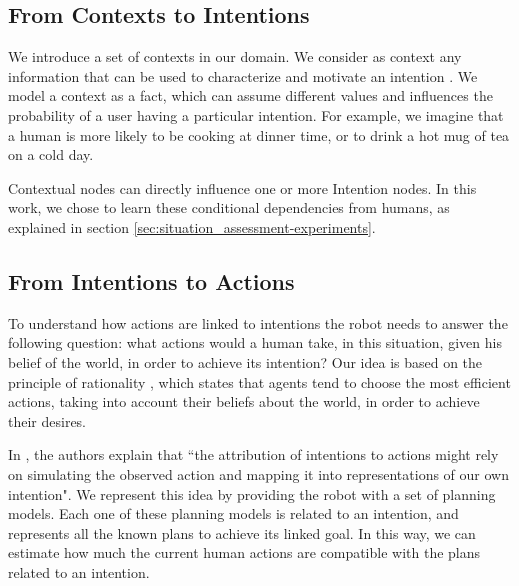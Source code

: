 \subsection{From Contexts to Intentions}
We introduce a set of contexts in our domain. We consider as context any information that can be used to characterize and motivate an intention \cite{abowd1999towards}. We model a context  as a fact, which can assume different values and influences the probability of a user having a particular intention. For example, we imagine that a human is more likely to be cooking at dinner time, or to drink a hot mug of tea on a cold day.

Contextual nodes can directly influence one or more Intention nodes. In this work, we chose to learn these conditional dependencies from humans, as explained in section \ref{sec:situation_assessment-experiments}.

\subsection{From Intentions to Actions}
\label{sec:situation_assessment-action_evaluation}
To understand how actions are linked to intentions the robot needs to answer the following question: what actions would a human take, in this situation, given his belief of the world, in order to achieve its intention?
Our idea is based on the principle of rationality \cite{Dennet1989}, which states that agents tend to choose the most efficient actions, taking into account their beliefs about the world, in order to achieve their desires.

In \cite{Blakemore2001}, the authors explain that ``the attribution of intentions to actions might rely on simulating the observed action and mapping it into representations of our own intention". We represent this idea by providing the robot with a set of planning models. Each one of these planning models is related to an intention, and represents all the known plans to achieve its linked goal. In this way, we can estimate how much the current human actions are compatible with the plans related to an intention.

